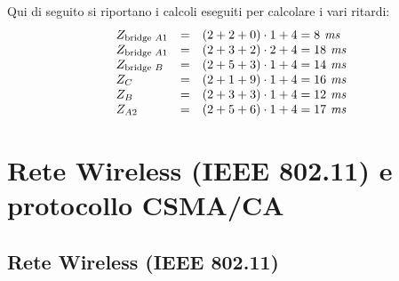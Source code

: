 \documentclass[a4paper]{article}
\begin{document}
	\noindent
	Qui di seguito si riportano i calcoli eseguiti per calcolare i vari ritardi:
	\begin{equation*}
		\begin{array}{lll}
			Z_{\text{bridge }A1}	& = & \left(2+2+0\right) \cdot 1 + 4 = 8 \emph{ ms} \\
			Z_{\text{bridge }A1}	& = & \left(2+3+2\right) \cdot 2 + 4 = 18 \emph{ ms} \\
			Z_{\text{bridge }B}		& = & \left(2+5+3\right) \cdot 1 + 4 = 14 \emph{ ms} \\
			Z_{C}					& = & \left(2+1+9\right) \cdot 1 + 4 = 16 \emph{ ms} \\
			Z_{B}					& = & \left(2+3+3\right) \cdot 1 + 4 = 12 \emph{ ms} \\
			Z_{A2}					& = & \left(2+5+6\right) \cdot 1 + 4 = 17 \emph{ ms}
		\end{array}
	\end{equation*}\newpage

	\section{Rete Wireless (IEEE 802.11) e protocollo CSMA/CA}
	
	\subsection{Rete Wireless (IEEE 802.11)}
	
\end{document}
